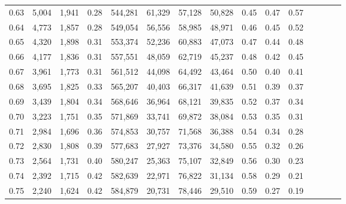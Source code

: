 \begin{tabular}{rrrcrrrrrrrrrrr}
0.63 &   5,004 &  1,941 &                                       0.28 &  544,281 &   61,329 &   57,128 &   50,828 &  0.45 &  0.47 &                         0.57 \\
0.64 &   4,773 &  1,857 &                                       0.28 &  549,054 &   56,556 &   58,985 &   48,971 &  0.46 &  0.45 &                         0.52 \\
0.65 &   4,320 &  1,898 &                                       0.31 &  553,374 &   52,236 &   60,883 &   47,073 &  0.47 &  0.44 &                         0.48 \\
0.66 &   4,177 &  1,836 &                                       0.31 &  557,551 &   48,059 &   62,719 &   45,237 &  0.48 &  0.42 &                         0.45 \\
0.67 &   3,961 &  1,773 &                                       0.31 &  561,512 &   44,098 &   64,492 &   43,464 &  0.50 &  0.40 &                         0.41 \\
0.68 &   3,695 &  1,825 &                                       0.33 &  565,207 &   40,403 &   66,317 &   41,639 &  0.51 &  0.39 &                         0.37 \\
0.69 &   3,439 &  1,804 &                                       0.34 &  568,646 &   36,964 &   68,121 &   39,835 &  0.52 &  0.37 &                         0.34 \\
0.70 &   3,223 &  1,751 &                                       0.35 &  571,869 &   33,741 &   69,872 &   38,084 &  0.53 &  0.35 &                         0.31 \\
0.71 &   2,984 &  1,696 &                                       0.36 &  574,853 &   30,757 &   71,568 &   36,388 &  0.54 &  0.34 &                         0.28 \\
0.72 &   2,830 &  1,808 &                                       0.39 &  577,683 &   27,927 &   73,376 &   34,580 &  0.55 &  0.32 &                         0.26 \\
0.73 &   2,564 &  1,731 &                                       0.40 &  580,247 &   25,363 &   75,107 &   32,849 &  0.56 &  0.30 &                         0.23 \\
0.74 &   2,392 &  1,715 &                                       0.42 &  582,639 &   22,971 &   76,822 &   31,134 &  0.58 &  0.29 &                         0.21 \\
0.75 &   2,240 &  1,624 &                                       0.42 &  584,879 &   20,731 &   78,446 &   29,510 &  0.59 &  0.27 &                         0.19 \\

\end{tabular}
